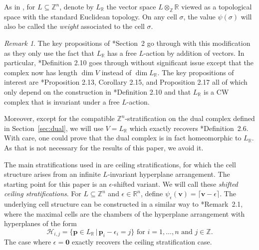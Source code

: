 \documentclass{amsart}
\newcommand{\ZZ}{\mathbb{Z}}
\newcommand{\RR}{\mathbb{R}}
\theoremstyle{remark}
\newtheorem{remark}[theorem]{Remark}
\begin{document}
As in \cite{stratification-paper}, for $L\subseteq \ZZ^n$, denote by $L_{\RR}$ the vector space $L\otimes_{\ZZ} \RR$ viewed as a topological space with the standard Euclidean topology. On any cell $\sigma$, the value $\psi(\sigma)$ will also be called the \emph{weight} associated to the cell $\sigma$.

\begin{remark}
  The key propositions of \cite{stratification-paper}*{Section~2} go through with this modification as they only use the fact that $L_{\RR}$ has a free $L$-action by addition of vectors. In particular, \cite{stratification-paper}*{Definition 2.10} goes through without significant issue except that the complex now has length $\dim V$ instead of $\dim L_{\RR}$. The key propositions of interest are \cite{stratification-paper}*{Proposition 2.13, Corollary 2.15, and Proposition 2.17} all of which only depend on the construction in \cite{stratification-paper}*{Definition 2.10} and that $L_{\RR}$ is a CW complex that is invariant under a free $L$-action.

  Moreover, except for the compatible $\ZZ^n$-stratification on the dual complex defined in Section~\ref{sec:dual}, we will use $V=L_{\RR}$ which exactly recovers \cite{stratification-paper}*{Definition~2.6}. With care, one could prove that the dual complex is in fact homeomorphic to $L_{\RR}$. As that is not necessary for the results of this paper, we avoid it.
\end{remark}

The main stratifications used in \cite{stratification-paper} are ceiling stratifications, for which the cell structure arises from an infinite $L$-invariant hyperplane arrangement.
The starting point for this paper is an $\epsilon$-shifted variant.
We will call these \emph{shifted ceiling stratifications}. 
For $L\subseteq \ZZ^n$ and $\epsilon \in \RR^n$, define $\psi_\epsilon(\bm{v}) = \lceil \bm{v} - \epsilon \rceil$.
The underlying cell structure can be constructed in a similar way to \cite{stratification-paper}*{Remark~2.1}, where the maximal cells are the chambers of the hyperplane arrangement with hyperplanes of the form
\[\mathcal{H}_{i,j}=\{\bm{p}\in L_{\RR} \,|\, \bm{p}_i-\epsilon_i=j\}\text{ for } i=1,\ldots,n \text{ and } j\in \ZZ.\]
The case where $\epsilon=\bm{0}$ exactly recovers the ceiling stratification case.
\end{document}
